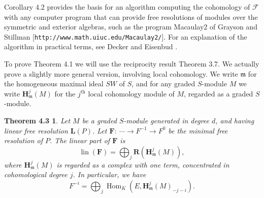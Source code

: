 \documentclass{tran-l}
\newcommand{\myHom}{\operatorname{Hom}}
\newcommand{\lin}{\operatorname{lin}}
\newcommand{\myth}{{\operatorname{th}}}
\newcommand{\F}{\mathcal{F}}
\newcommand{\FF}{\mathbf{F}}
\newcommand{\myH}{\mathbf{H}}
\newcommand{\LL}{\mathbf{L}}
\newcommand{\RR}{\mathbf{R}}
\newcommand{\gm}{{\mathfrak{m}}}
\theoremstyle{plain}
\newtheorem*{theorem18}{Theorem 4.3}
\theoremstyle{remark}
\theoremstyle{definition}
\begin{document}
Corollary 4.2 provides the basis for
an algorithm
computing the cohomology of $\F $ with
any computer program that can provide free resolutions
of modules over the symmetric and exterior algebras,
such as the program Macaulay2 of Grayson and Stillman
[{\tt http://www.math.uiuc.edu/Macaulay2/}].
For an explanation of the algorithm in practical terms, see
Decker and Eisenbud \cite{DE}.

To prove Theorem 4.1 we will use
the reciprocity result Theorem 3.7. We actually prove
a slightly more general version,
involving local cohomology. We write $\gm $ for the homogeneous maximal
ideal $SW$ of $S$, and for any graded $S$-module $M$ we write
$\myH ^{j}_{\gm }(M)$ for the $j^{\myth }$ local cohomology module of $M$, regarded
as a graded $S$-module.

\begin{theorem18}
Let $M$ be a graded $S$-module
generated in degree $d$, and having
linear free resolution $\LL (P)$. Let
$\FF :\ \cdots \to F^{-1}\to F^{0}$ be the minimal free resolution of $P$.
The linear part
of $\FF $ is
\begin{equation*}\lin (\FF )=\bigoplus _{j}\RR (\myH ^{j}_{\gm }(M)),
\end{equation*}
where $\myH ^{j}_{\gm }(M)$ is
regarded as a complex with one term, concentrated in
cohomological degree $j$. In particular, we have
\begin{equation*}F^{-i}=\bigoplus _{j}\myHom _{K}(E, \myH ^{j}_{\gm }(M)_{-j-i}).
\end{equation*}
\end{theorem18}
\end{document}
